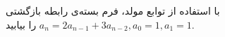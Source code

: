 \EXERCISE
با استفاده از توابع مولد، فرم بسته‌ی رابطه بازگشتی
$a_n = 2a_{n-1} + 3a_{n-2}, a_0 = 1, a_1 = 1$
را بیابید.